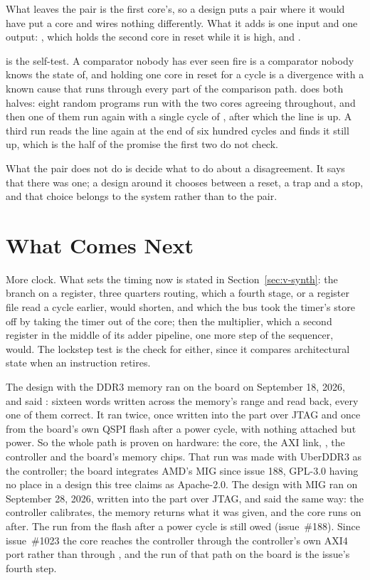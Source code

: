 \documentclass[journal,onecolumn,9pt]{IEEEtran}
\begin{document}
What leaves the pair is the first core's, so a design puts a pair
where it would have put a core and wires nothing differently. What it
adds is one input and one output: , which holds the second
core in reset while it is high, and .

 is the self-test. A comparator nobody has ever seen fire
is a comparator nobody knows the state of, and holding one core in
reset for a cycle is a divergence with a known cause that runs through
every part of the comparison path. 
does both halves: eight random programs run with the two cores agreeing
throughout, and then one of them run again with a single cycle of
, after which the line is up. A third run reads the line
again at the end of six hundred cycles and finds it still up, which is
the half of the promise the first two do not check.

What the pair does not do is decide what to do about a disagreement.
It says that there was one; a design around it chooses between a
reset, a trap and a stop, and that choice belongs to the system rather
than to the pair.

\section{What Comes Next}
\label{sec:v-next}

More clock. What sets the timing now is stated in
Section~\ref{sec:v-synth}: the branch on a register, three quarters
routing, which a fourth stage, or a register file read a cycle
earlier, would shorten, and which the bus took the timer's store off
by taking the timer out of the core; then the multiplier, which a
second register in the middle of its adder pipeline, one more step of
the sequencer, would. The lockstep test is the check for either,
since it compares architectural state when an instruction retires.

The design with the DDR3 memory ran on the board on September 18,
2026, and said : sixteen words written across the
memory's range and read back, every one of them correct. It ran twice,
once written into the part over JTAG and once from the board's own QSPI
flash after a power cycle, with nothing attached but power. So the
whole path is proven on hardware: the core, the AXI link, ,
the controller and the board's memory chips. That run was made with
UberDDR3 as the controller; the board integrates AMD's MIG since issue
188, GPL-3.0 having no place in a design this tree claims as
Apache-2.0. The design with MIG ran on September 28, 2026, written into
the part over JTAG, and said  the same way: the
controller calibrates, the memory returns what it was given, and the
core runs on after. The run from the flash after a power cycle is still
owed (issue~\#188). Since issue~\#1023 the core reaches the controller
through the controller's own AXI4 port rather than through
, and the run of that path on the board is the issue's
fourth step.
\end{document}
